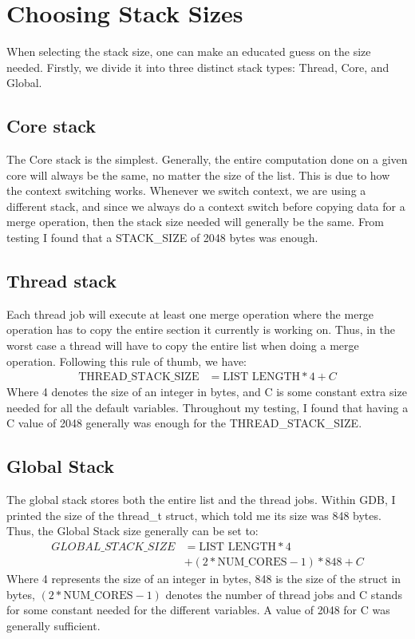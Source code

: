 \section{Choosing Stack Sizes}\label{ap:stack}
When selecting the stack size, one can make an educated guess on the size
needed. Firstly, we divide it into three distinct stack types: Thread, Core, and
Global.

\subsection*{Core stack}
The Core stack is the simplest. Generally, the entire computation done on a
given core will always be the same, no matter the size of the list. This is due
to how the context switching works. Whenever we switch context, we are using a
different stack, and since we always do a context switch before copying data for
a merge operation, then the stack size needed will generally be the same. From
testing I found that a STACK\_SIZE of 2048 bytes was enough.

\subsection*{Thread stack}
Each thread job will execute at least one merge operation where the merge
operation has to copy the entire section it currently is working on. Thus, in
the worst case a thread will have to copy the entire list when doing a merge
operation. Following this rule of thumb, we have:
\begin{align}
  \text{THREAD\_STACK\_SIZE} &= \text{LIST LENGTH} * 4 + C
\end{align}
Where 4 denotes the size of an integer in bytes, and C is some constant extra
size needed for all the default variables. Throughout my testing, I found that
having a C value of 2048 generally was enough for the THREAD\_STACK\_SIZE.

\subsection*{Global Stack}
The global stack stores both the entire list and the thread jobs. Within GDB, I
printed the size of the thread\_t struct, which told me its size was 848 bytes.
Thus, the Global Stack size generally can be set to:
\begin{align}
  GLOBAL\_STACK\_SIZE &= \text{LIST LENGTH} * 4  \\
                      &+ (2 * \text{NUM\_CORES} - 1) * 848  + C
\end{align}
Where 4 represents the size of an integer in bytes, 848 is the size of the
struct in bytes, $(2 * \text{NUM\_CORES} - 1)$ denotes the number of thread jobs
and C stands for some constant needed for the different variables. A value of
2048 for C was generally sufficient.

